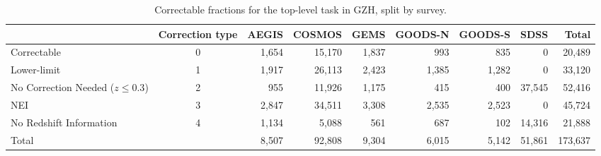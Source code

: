 \documentclass[twocolumn]{aastex6}
\begin{document}
\begin{table}
\caption{Correctable fractions for the top-level task in GZH, split by survey.}\label{tbl:hubble_debiasable}
\begin{tabular}{lcrrrrrrr}
\hline\hline
                                   & Correction type & AEGIS   & COSMOS & GEMS & GOODS-N & GOODS-S    & SDSS    & Total \\
\hline
Correctable                        & 0               & 1,654   & 15,170 & 1,837 & 993    & 835     	& 0       & 20,489\\
Lower-limit                        & 1               & 1,917   & 26,113 & 2,423 & 1,385  & 1,282   	& 0       & 33,120\\
No Correction Needed ($z \le 0.3$) & 2               & 955     & 11,926 & 1,175 & 415    & 400     	& 37,545  & 52,416\\ 
NEI                                & 3               & 2,847   & 34,511 & 3,308 & 2,535  & 2,523   	& 0       & 45,724\\
No Redshift Information            & 4               & 1,134   & 5,088  & 561   & 687    & 102   		& 14,316  & 21,888\\
Total                              &                 & 8,507   & 92,808 & 9,304 & 6,015  & 5,142   	& 51,861  & 173,637\\
\hline\hline
\end{tabular}
\end{table}

\end{document}
